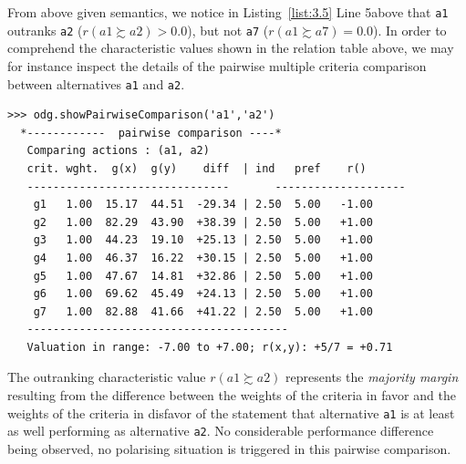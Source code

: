 From above given semantics, we notice in Listing~\ref{list:3.5} Line 5above that \texttt{a1} outranks \texttt{a2} ($r(a1 \succsim a2) > 0.0$), but not \texttt{a7} ($r(a1 \succsim a7) = 0.0$). In order to comprehend the characteristic values shown in the relation table above, we may for instance inspect the details of the pairwise multiple criteria comparison between alternatives \texttt{a1} and \texttt{a2}.
\begin{lstlisting}[caption={Inspecting a pairwise multiple criteria comparison},label=list:3.6]
>>> odg.showPairwiseComparison('a1','a2')
  *------------  pairwise comparison ----*
   Comparing actions : (a1, a2)
   crit. wght.  g(x)  g(y)    diff  | ind   pref    r() 
   -------------------------------  	 --------------------
    g1   1.00  15.17  44.51  -29.34 | 2.50  5.00   -1.00 
    g2   1.00  82.29  43.90  +38.39 | 2.50  5.00   +1.00 
    g3   1.00  44.23  19.10  +25.13 | 2.50  5.00   +1.00 
    g4   1.00  46.37  16.22  +30.15 | 2.50  5.00   +1.00 
    g5   1.00  47.67  14.81  +32.86 | 2.50  5.00   +1.00 
    g6   1.00  69.62  45.49  +24.13 | 2.50  5.00   +1.00 
    g7   1.00  82.88  41.66  +41.22 | 2.50  5.00   +1.00 
   ----------------------------------------
   Valuation in range: -7.00 to +7.00; r(x,y): +5/7 = +0.71
\end{lstlisting}

The outranking characteristic value $r(a1 \succsim a2)$ represents the \emph{majority margin} resulting from the difference between the weights of the criteria in favor and the weights of the criteria in disfavor of the statement that alternative \texttt{a1} is at least as well performing as alternative \texttt{a2}. No considerable performance difference being observed, no polarising situation is triggered in this pairwise comparison.


